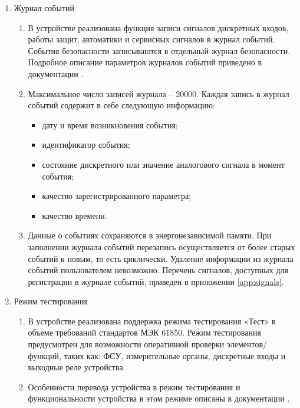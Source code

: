 \begin{enumerate}[label=\arabic{section}.\arabic{subsection}.\arabic*, labelsep=7pt, leftmargin=0pt, itemindent=60pt, align=left]
\item Журнал событий
\begin{enumerate}
\item В устройстве реализована функция записи сигналов дискретных входов, работы защит, автоматики и сервисных сигналов в журнал событий.
События безопасности записываются в отдельный журнал безопасности.
Подробное описание параметров журналов событий приведено в документации \ManualUnitGeneral.
\item Максимальное число записей журнала -- 20000.
Каждая запись в журнал событий содержит в себе следующую информацию:
\begin{itemize}
\item дату и время возникновения события;
\item идентификатор события;
\item состояние дискретного или значение аналогового сигнала в момент события;
\item качество зарегистрированного параметра;
\item качество времени.
\end{itemize}
\item Данные о событиях сохраняются в энергонезависимой памяти.
При заполнении журнала событий перезапись осуществляется от более старых событий к новым, то есть циклически.
Удаление информации из журнала событий пользователем невозможно.
Перечень сигналов, доступных для регистрации в журнале событий, приведен в приложении \ref{app:signals}.
\end{enumerate}

\item Режим тестирования
\begin{enumerate}
\item В устройстве реализована поддержка режима тестирования «Тест» в объеме требований стандартов МЭК 61850.
Режим тестирования предусмотрен для возможности оперативной проверки элементов/функций, таких как: ФСУ, измерительные органы, дискретные входы и выходные реле устройства.
\item Особенности перевода устройства в режим тестирования и функциональности устройства в этом режиме описаны в документации \ManualUnitGeneral.
\end{enumerate}


\end{enumerate}
